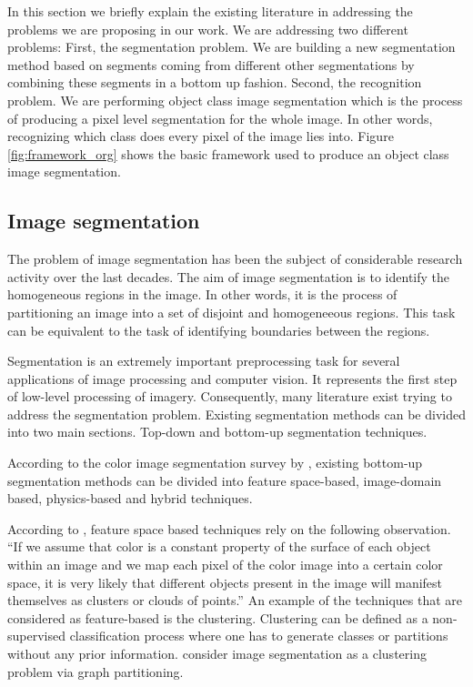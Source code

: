 \documentclass[twoside,11pt]{article}
\begin{document}
In this section we briefly explain the existing literature in addressing the
problems we are proposing in our work. We are addressing two different problems:
First, the segmentation problem. We are building a new segmentation method
based on segments coming from different other segmentations by combining these
segments in a bottom up fashion. Second, the
recognition problem. We are performing object class image segmentation which
is the process of producing a pixel level segmentation for the whole image.
In other words, recognizing which class does every pixel of the image
lies into. Figure \ref{fig:framework_org} shows the basic framework used
to produce an object class image segmentation.

\subsection{Image segmentation}

The problem of image segmentation has been the subject of considerable research
activity
over the last decades. The aim of image segmentation is to identify the
homogeneous
regions in the image. In other words, it is the process of partitioning an image
into
a set of disjoint and homogeneeous regions. This task can be equivalent to the
task of
identifying boundaries between the regions.

Segmentation is an extremely important preprocessing task for several
applications of
image processing and computer vision. It represents the first step of low-level
processing of imagery. Consequently, many literature exist trying to address the
segmentation problem. Existing segmentation methods can be divided into two
main sections. Top-down and bottom-up segmentation techniques.

According to the color image segmentation survey by \cite{Yz_colorimage},
existing bottom-up segmentation methods can be divided into feature space-based,
image-domain based, physics-based and hybrid techniques.

According to \cite{Yz_colorimage}, feature space based techniques rely on the
following observation. ``If we assume that color is a constant property of the 
surface of each object within an image and we map each pixel of the color image
into a certain color space, it is very likely that different objects present in
the image will manifest themselves as clusters or clouds of points.'' An example
of the techniques that are considered as feature-based is the clustering.
Clustering
can be defined as a non-supervised classification process where one has to generate
classes or partitions without any prior information. \cite{Shi_2000_3808} consider
image segmentation as a clustering problem via graph partitioning.
\end{document}
